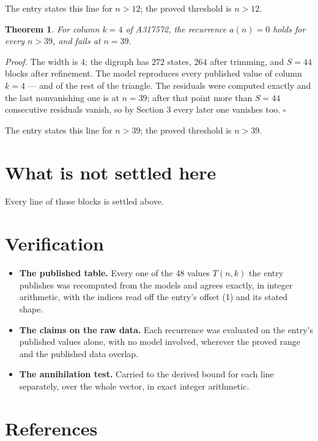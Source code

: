 \documentclass[11pt]{article}
\newtheorem{theorem}{Theorem}
\theoremstyle{definition}
\begin{document}
The entry states this line for $n > 12$; the proved threshold is $n > 12$.

\begin{theorem} For column $k = 4$ of A317572, the recurrence $a(n) = 0$ holds for every $n > 39$, and fails at $n = 39$.\end{theorem}

{\itshape Proof.} The width is $4$; the digraph has $272$ states, $264$ after trimming, and $S = 44$ blocks after refinement. The model reproduces every published value of column $k = 4$ --- and of the rest of the triangle. The residuals were computed exactly and the last nonvanishing one is at $n = 39$; after that point more than $S = 44$ consecutive residuals vanish, so by Section 3 every later one vanishes too. $\square$

The entry states this line for $n > 39$; the proved threshold is $n > 39$.

\section{What is not settled here}

Every line of those blocks is settled above.

\section{Verification}

\begin{itemize}

\item {\bfseries The published table.} Every one of the 48 values $T(n,k)$ the entry publishes was recomputed from the models and agrees exactly, in integer arithmetic, with the indices read off the entry's offset (1) and its stated shape.

\item {\bfseries The claims on the raw data.} Each recurrence was evaluated on the entry's published values alone, with no model involved, wherever the proved range and the published data overlap.

\item {\bfseries The annihilation test.} Carried to the derived bound for each line separately, over the whole vector, in exact integer arithmetic.

\end{itemize}

\section{References}
\end{document}
